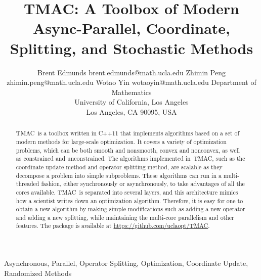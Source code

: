 \documentclass[twoside,11pt]{article}
\newcommand{\pkg}{{TMAC}}
\newcommand{\repo}{\url{https://github.com/uclaopt/TMAC}}
\begin{document}
\title{\pkg: A Toolbox of Modern Async-Parallel, Coordinate, Splitting, and Stochastic Methods}

\author{\name Brent Edmunds \email brent.edmunds@math.ucla.edu
       \AND
       \name Zhimin Peng \email zhimin.peng@math.ucla.edu
       \AND
        \name Wotao Yin \email wotaoyin@math.ucla.edu 
       \AND
       \addr Department of Mathematics\\
       University of California, Los Angeles\\
       Los Angeles, CA 90095, USA}

\maketitle

\begin{abstract}
\pkg~is a toolbox written in C++11 that implements algorithms based on a set of modern methods for large-scale optimization. It covers a variety of optimization problems, which can be both smooth and nonsmooth, convex and nonconvex, as well as constrained and unconstrained. The algorithms implemented in~\pkg, such as the coordinate update method and operator splitting method, are scalable as they decompose a problem into simple subproblems. These algorithms can run in a multi-threaded fashion, either synchronously or asynchronously, to take advantages of all the cores available. \pkg~is separated into several layers, and this architecture mimics how a scientist writes down an optimization algorithm. Therefore, it is easy for one to obtain a new algorithm by making simple modifications such as adding a new operator and adding a new splitting, while maintaining the multi-core parallelism and other features. The package is available at \repo.
\end{abstract}

\begin{keywords}
Asynchronous, Parallel, Operator Splitting, Optimization, Coordinate Update, Randomized Methods
\end{keywords}








% 

%

%

%


% 


% 

% 

% 





\end{document}
